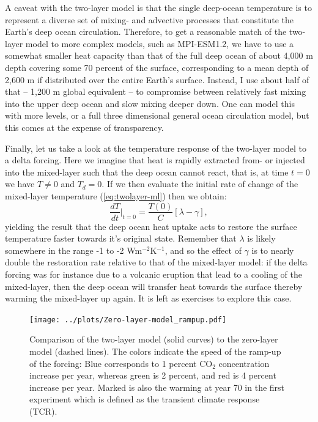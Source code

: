 \documentclass[12pt]{book}
\begin{document}
A caveat with the two-layer model is that the single deep-ocean temperature is to represent a diverse set of mixing- and advective processes that constitute the Earth's deep ocean circulation. Therefore, to get a reasonable match of the two-layer model to more complex models, such as MPI-ESM1.2, we have to use a somewhat smaller heat capacity than that of the full deep ocean of about 4,000 m depth covering some 70 percent of the surface, corresponding to a mean depth of 2,600 m if distributed over the entire Earth's surface. Instead, I use about half of that -- 1,200 m global equivalent -- to compromise between relatively fast mixing into the upper deep ocean and slow mixing deeper down. One can model this with more levels, or a full three dimensional general ocean circulation model, but this comes at the expense of transparency.

Finally, let us take a look at the temperature response of the two-layer model to a delta forcing. Here we imagine that heat is rapidly extracted from- or injected into the mixed-layer such that the deep ocean cannot react, that is, at time $t=0$ we have  $T\ne 0$ and $T_d=0$. If we then evaluate the initial rate of change of the mixed-layer temperature (\ref{eq:twolayer-ml}) then we obtain:
\begin{equation}
\frac{dT}{dt}\Bigr|_{t=0} = \frac{T(0)}{C}\left[\lambda - \gamma\right],
\label{eqn:T-perturbation}
\end{equation}
yielding the result that the deep ocean heat uptake acts to restore the surface temperature faster towards it's original state. Remember that $\lambda$ is likely somewhere in the range -1 to -2 Wm$^{-2}$K$^{-1}$, and so the effect of $\gamma$ is to nearly double the restoration rate relative to that of the mixed-layer model: if the delta forcing was for instance due to a volcanic eruption that lead to a cooling of the mixed-layer, then the deep ocean will transfer heat towards the surface thereby warming the mixed-layer up again. It is left as exercises to explore this case.

\begin{figure}
\begin{center}
\texttt{[image: ../plots/Zero-layer-model\_rampup.pdf]}
\end{center}
\caption{ Comparison of the two-layer model (solid curves) to the zero-layer model (dashed lines). The colors indicate the speed of the ramp-up of the forcing: Blue corresponds to 1 percent CO$_2$ concentration increase per year, whereas green is 2 percent, and red is 4 percent increase per year. Marked is also the warming at year 70 in the first experiment which is defined as the transient climate response (TCR).} 
\label{fig:zero_layer_plot}
\end{figure}
\end{document}
